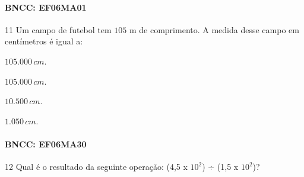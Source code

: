 {\paragraph{BNCC: EF06MA01 }


\num{11} Um campo de futebol tem $105$ m de comprimento. A medida desse campo em centímetros é igual a:

\begin{escolha}
\item $105.000\,cm$.
\item $105.000\,cm$.
\item $10.500\,cm$.
\item $1.050\,cm$.
\end{escolha}

\paragraph{BNCC: EF06MA30}


\num{12} Qual é o resultado da seguinte operação: (4,5 x $10^2$) ÷ (1,5 x $10^2$)?

}
